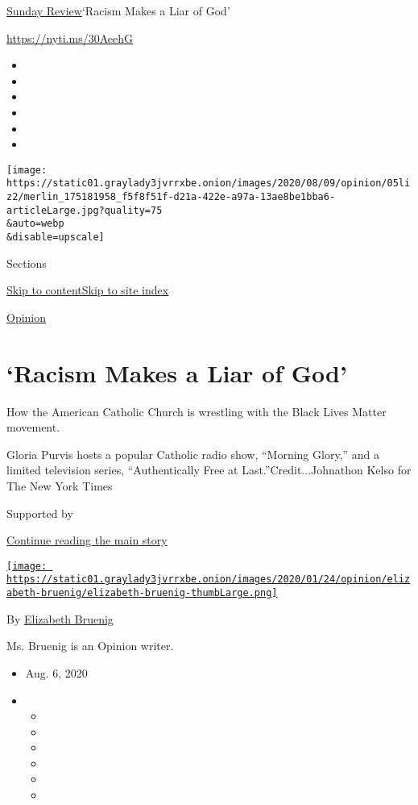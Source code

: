 \href{/section/opinion/sunday}{Sunday Review}\textbar{}`Racism Makes a
Liar of God'

\href{https://nyti.ms/30AeehG}{https://nyti.ms/30AeehG}

\begin{itemize}
\item
\item
\item
\item
\item
\item
\end{itemize}

\texttt{[image: https://static01.graylady3jvrrxbe.onion/images/2020/08/09/opinion/05liz2/merlin\_175181958\_f5f8f51f-d21a-422e-a97a-13ae8be1bba6-articleLarge.jpg?quality=75\\\&auto=webp\\\&disable=upscale]}

Sections

\protect\hyperlink{site-content}{Skip to
content}\protect\hyperlink{site-index}{Skip to site index}

\href{/section/opinion}{Opinion}

\hypertarget{racism-makes-a-liar-of-god}{%
\section{`Racism Makes a Liar of
God'}\label{racism-makes-a-liar-of-god}}

How the American Catholic Church is wrestling with the Black Lives
Matter movement.

Gloria Purvis hosts a popular Catholic radio show, ``Morning Glory,''
and a limited television series, ``Authentically Free at
Last.''Credit...Johnathon Kelso for The New York Times

Supported by

\protect\hyperlink{after-sponsor}{Continue reading the main story}

\href{https://www.nytimes3xbfgragh.onion/by/elizabeth-bruenig}{\texttt{[image: https://static01.graylady3jvrrxbe.onion/images/2020/01/24/opinion/elizabeth-bruenig/elizabeth-bruenig-thumbLarge.png]}}

By
\href{https://www.nytimes3xbfgragh.onion/by/elizabeth-bruenig}{Elizabeth
Bruenig}

Ms. Bruenig is an Opinion writer.

\begin{itemize}
\item
  Aug. 6, 2020
\item
  \begin{itemize}
  \item
  \item
  \item
  \item
  \item
  \item
  \end{itemize}
\end{itemize}

